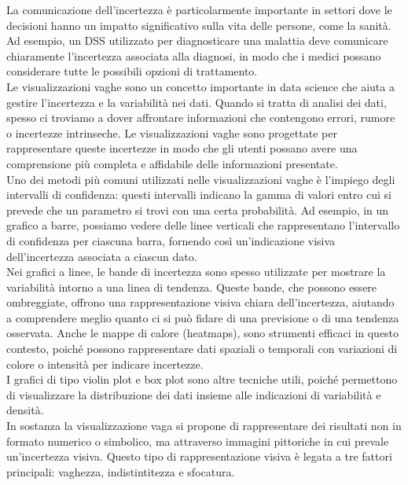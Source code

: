 La comunicazione dell'incertezza è particolarmente importante in settori dove le decisioni hanno un impatto significativo sulla vita delle persone, come la sanità. Ad esempio, un DSS utilizzato per diagnosticare una malattia deve comunicare chiaramente l'incertezza associata alla diagnosi, in modo che i medici possano considerare tutte le possibili opzioni di trattamento.\\
Le visualizzazioni vaghe sono un concetto importante in data science che aiuta a gestire l'incertezza e la variabilità nei dati. Quando si tratta di analisi dei dati, spesso ci troviamo a dover affrontare informazioni che contengono errori, rumore o incertezze intrinseche. Le visualizzazioni vaghe sono progettate per rappresentare queste incertezze in modo che gli utenti possano avere una comprensione più completa e affidabile delle informazioni presentate.\\
Uno dei metodi più comuni utilizzati nelle visualizzazioni vaghe è l'impiego degli intervalli di confidenza: questi intervalli indicano la gamma di valori entro cui si prevede che un parametro si trovi con una certa probabilità. Ad esempio, in un grafico a barre, possiamo vedere delle linee verticali che rappresentano l'intervallo di confidenza per ciascuna barra, fornendo così un'indicazione visiva dell'incertezza associata a ciascun dato.\\
Nei grafici a linee, le bande di incertezza sono spesso utilizzate per mostrare la variabilità intorno a una linea di tendenza. Queste bande, che possono essere ombreggiate, offrono una rappresentazione visiva chiara dell'incertezza, aiutando a comprendere meglio quanto ci si può fidare di una previsione o di una tendenza osservata. Anche le mappe di calore (heatmaps), sono strumenti efficaci in questo contesto, poiché possono rappresentare dati spaziali o temporali con variazioni di colore o intensità per indicare incertezze.\\
I grafici di tipo violin plot e box plot sono altre tecniche utili, poiché permettono di visualizzare la distribuzione dei dati insieme alle indicazioni di variabilità e densità.\\
In sostanza la visualizzazione vaga si propone di rappresentare dei risultati non in formato numerico o simbolico, ma attraverso immagini pittoriche in cui prevale un'incertezza visiva. Questo tipo di rappresentazione visiva è legata a tre fattori principali: vaghezza, indistintitezza e sfocatura. \\

